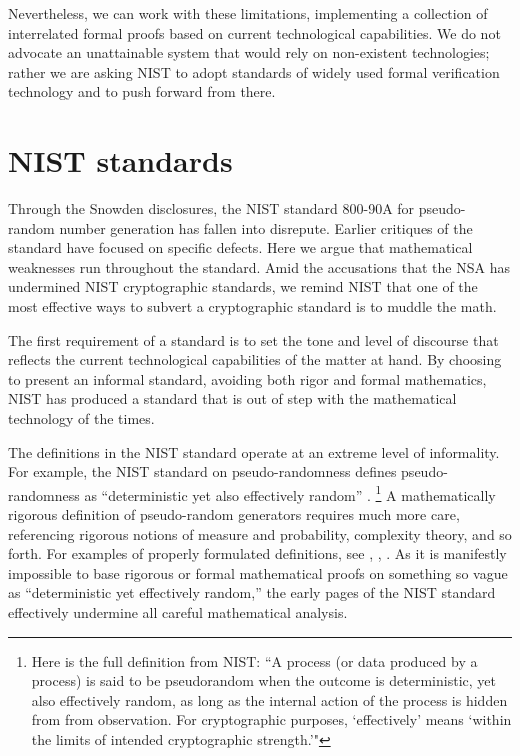 \documentclass[11pt]{amsart} %
\begin{document}
Nevertheless, we can work with these limitations, implementing a collection of interrelated formal proofs
based on current technological capabilities.  We do not advocate an unattainable system
that would rely on non-existent technologies; rather we are asking NIST
to adopt standards of widely used formal verification technology and to push forward from there.


\section{NIST standards}

Through the Snowden disclosures, the NIST standard 800-90A for pseudo-random number
generation has fallen into disrepute.  Earlier critiques of the standard have focused on specific
defects.  Here we argue that 
mathematical weaknesses run throughout the standard.  Amid the accusations that the NSA has undermined NIST
cryptographic standards, we remind NIST that one of the most effective ways to subvert a cryptographic standard is to 
muddle the math.

The first requirement of a standard is to set the tone and level of discourse that reflects the current
technological capabilities of the matter at hand.  By choosing to present an informal standard, 
avoiding both rigor and formal mathematics,
NIST has produced a standard that is out of step with the mathematical technology of the times.

The definitions in the NIST standard 
operate at an extreme level of informality.
For example,  the NIST standard on pseudo-randomness defines pseudo-randomness as ``deterministic yet also effectively random'' \cite[page 7]{NIST}.%
\footnote{Here is the full definition from NIST: 
``A process (or data produced by a process) is said to be pseudorandom when the
outcome is deterministic, yet also effectively random, as long as the internal action of the process
is hidden from from observation.  For cryptographic purposes, `effectively' means `within the limits
of intended cryptographic strength.'"}
A mathematically rigorous definition of pseudo-random generators
requires much more care, referencing rigorous notions of measure and probability,
complexity theory, and so forth.  For examples of properly formulated definitions, see \cite{Luby1996}, \cite{Yao82}, \cite{BM84}.
As it is manifestly impossible to base rigorous or formal mathematical proofs
on something so vague as ``deterministic yet effectively random,'' the early pages of the NIST standard 
effectively undermine all careful mathematical analysis.
\end{document}
